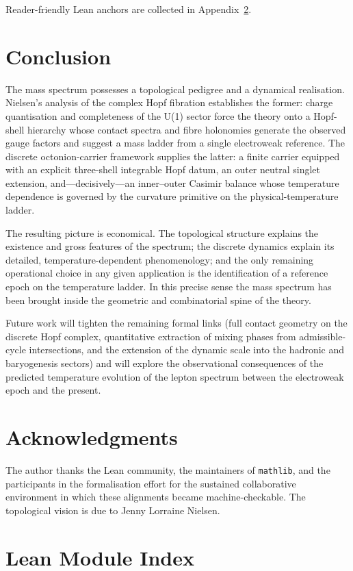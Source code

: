 \documentclass[11pt]{amsart}
\begin{document}
Reader-friendly Lean anchors are collected in Appendix~\ref{app:lean-index}.

\section{Conclusion}

The mass spectrum possesses a topological pedigree and a dynamical realisation. Nielsen's analysis of the complex Hopf fibration establishes the former: charge quantisation and completeness of the U(1) sector force the theory onto a Hopf-shell hierarchy whose contact spectra and fibre holonomies generate the observed gauge factors and suggest a mass ladder from a single electroweak reference. The discrete octonion-carrier framework supplies the latter: a finite carrier equipped with an explicit three-shell integrable Hopf datum, an outer neutral singlet extension, and---decisively---an inner--outer Casimir balance whose temperature dependence is governed by the curvature primitive on the physical-temperature ladder.

The resulting picture is economical. The topological structure explains the existence and gross features of the spectrum; the discrete dynamics explain its detailed, temperature-dependent phenomenology; and the only remaining operational choice in any given application is the identification of a reference epoch on the temperature ladder. In this precise sense the mass spectrum has been brought inside the geometric and combinatorial spine of the theory.

Future work will tighten the remaining formal links (full contact geometry on the discrete Hopf complex, quantitative extraction of mixing phases from admissible-cycle intersections, and the extension of the dynamic scale into the hadronic and baryogenesis sectors) and will explore the observational consequences of the predicted temperature evolution of the lepton spectrum between the electroweak epoch and the present.

\section*{Acknowledgments}
The author thanks the Lean community, the maintainers of \texttt{mathlib}, and the participants in the formalisation effort for the sustained collaborative environment in which these alignments became machine-checkable. The topological vision is due to Jenny Lorraine Nielsen.

\appendix
\section{Lean Module Index}\label{app:lean-index}
\end{document}
